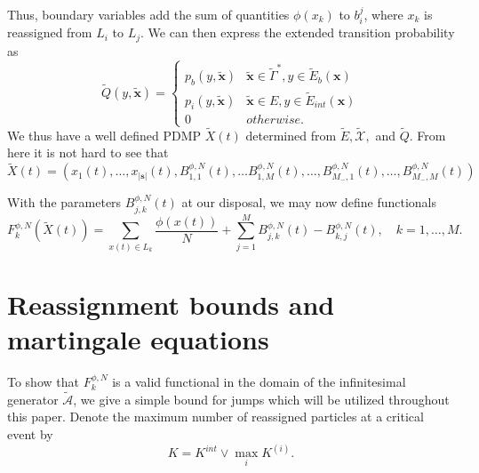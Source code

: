 Thus, boundary variables add the sum of quantities $\phi(x_k)$ to $b_i^j$, where $x_k$ is reassigned from $L_i$ to $L_j$.
We can then express the extended transition probability as  
\begin{equation}
\tilde Q(y,\tilde {\textbf{x}}) = \begin{cases}p_{b}(y,\tilde {\textbf{x}}) & \tilde {\textbf{x}} \in \tilde \Gamma^*, y\in \tilde E_b(\textbf{x}) \\
p_{i}(y,\tilde {\textbf{x}}) & \tilde {\textbf{x}} \in E, y \in \tilde E_{int}(\textbf{x})   \\
0 & otherwise. 
\end{cases}
\end{equation}
We thus have a well defined PDMP $\tilde X(t)$ determined from $\tilde E, \tilde{\mathcal X},$ and $ \tilde Q$. From here it is not hard to see that 
\begin{equation}
\tilde X(t) = \left(x_1(t), \dots, x_{|\mathbf s|}(t),B_{1,1}^{\phi,N}(t), \dots B_{1,M}^{\phi,N}(t), \dots, B_{M_-,1}^{\phi, N}(t), \dots, B_{M_-,M}^{\phi,N}(t)\right)
\end{equation} 


With the parameters $B_{j,k}^{\phi,N}(t)$ at our disposal, we may now define functionals
\begin{equation}
F^{\phi,N}_k(\tilde X(t)) = \sum_{x(t)\in L_k} \frac{\phi(x(t))}{N}+\sum_{j= 1}^M B_{j,k}^{\phi,N}(t)-B_{k,j}^{\phi,N}(t) , \quad k = 1, \dots, M. 
\end{equation}
\section{Reassignment bounds and martingale equations}
To show that  $F^{\phi,N}_k$ is a valid functional in the domain of the infinitesimal generator $\tilde{\mathcal{A}}$, we give a simple bound for jumps which will be utilized throughout this paper.  Denote the maximum number of reassigned particles at a critical event by 
\begin{equation}
K = K^{int} \vee \max_i K^{(i)}.
\end{equation}


